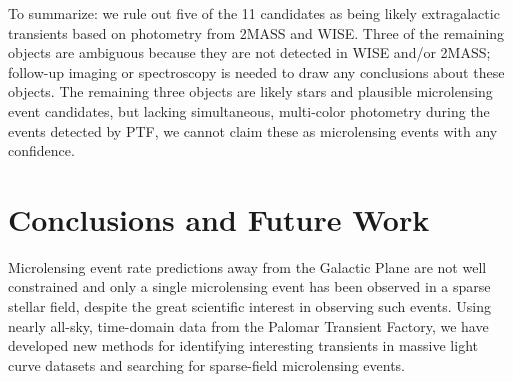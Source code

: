 \documentclass{emulateapj}
\begin{document}
To summarize: we rule out five of the 11 candidates as being likely extragalactic transients based on photometry from 2MASS and WISE. Three of the remaining objects are ambiguous because they are not detected in WISE and/or 2MASS; follow-up imaging or spectroscopy is needed to draw any conclusions about these objects. The remaining three objects are likely stars and plausible microlensing event candidates, but lacking simultaneous, multi-color photometry during the events detected by PTF, we cannot claim these as microlensing events with any confidence.  




\section{Conclusions and Future Work}
Microlensing event rate predictions away from the Galactic Plane are not well constrained and only a single microlensing event has been observed in a sparse stellar field, despite the great scientific interest in observing such events. Using nearly all-sky, time-domain data from the Palomar Transient Factory, we have developed new methods for identifying interesting transients in massive light curve datasets and searching for sparse-field microlensing events. 
\end{document}
